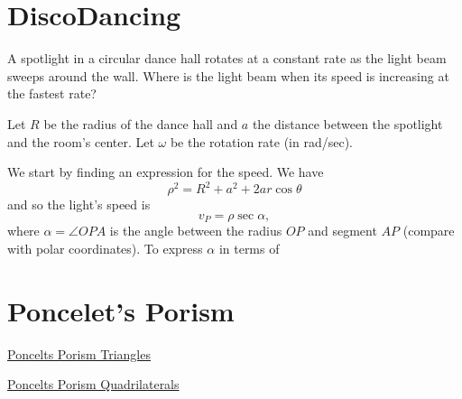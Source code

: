 \documentclass{ximera}
\begin{document}
\section*{DiscoDancing}

A spotlight in a circular dance hall rotates at a constant rate as the light beam sweeps around the wall. Where is the light beam when its speed is increasing at the fastest rate?

Let $R$ be the radius of the dance hall and $a$ the distance between the spotlight and the room's center. Let $\omega$ be the rotation rate (in rad/sec).

We start by finding an expression for the speed. We have
\[
  \rho^2 = R^2 + a^2 + 2ar \cos \theta
\]
and so the light's speed is
\[
   v_P = \rho \sec \alpha ,
\] 
where $\alpha = \angle OPA$ is the angle between the radius $OP$ and segment $AP$ (compare with polar coordinates). To express $\alpha$ in terms of  

\section*{Poncelet's Porism}


\begin{exploration}

\begin{onlineOnly}
    \begin{center}
\end{center}
\end{onlineOnly}

\href{https://www.desmos.com/calculator/0aihemcv0o}{Poncelts Porism Triangles}

\end{exploration}


\begin{exploration}

\begin{onlineOnly}
    \begin{center}
\end{center}
\end{onlineOnly}

\href{https://www.desmos.com/calculator/pua4ogjcmr}{Poncelts Porism Quadrilaterals}


\end{exploration}



\begin{onlineOnly}
    \begin{center}
\end{center}
\end{onlineOnly}
\end{document}
